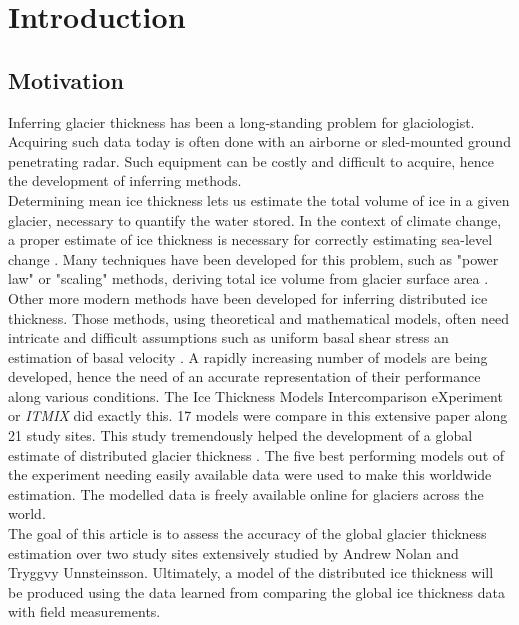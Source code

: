 \documentclass[a4, 12pt]{article}
\begin{document}
\section{Introduction}
\subsection{Motivation}
Inferring glacier thickness has been a long-standing problem for glaciologist. Acquiring such data today is often done with an airborne or sled-mounted ground penetrating radar. Such equipment can be costly and difficult to acquire, hence the development of inferring methods.\\

Determining mean ice thickness lets us estimate the total volume of ice in a given glacier, necessary to quantify the water stored. In the context of climate change, a proper estimate of ice thickness is necessary for correctly estimating sea-level change \cite{farinotti2016accurate}. Many techniques have been developed for this problem, such as "power law" or "scaling" methods, deriving total ice volume from glacier surface area \cite{bahr2015review}. Other more modern methods have been developed for inferring distributed ice thickness. Those methods, using theoretical and mathematical models, often need intricate and difficult assumptions such as uniform basal shear stress an estimation of basal velocity \cite{farinotti2016accurate}. A rapidly increasing number of models are being developed, hence the need of an accurate representation of their performance along various conditions. The Ice Thickness Models Intercomparison eXperiment \cite{farinotti2016accurate} or \textit{ITMIX} did exactly this. 17 models were compare in this extensive paper along 21 study sites. This study tremendously helped the development of a global estimate of distributed glacier thickness \cite{farinotti2019consensus}. The five best performing models out of the experiment needing easily available data were used to make this worldwide estimation. The modelled data is freely available online for glaciers across the world.\\

The goal of this article is to assess the accuracy of the global glacier thickness estimation over two study sites extensively studied by Andrew Nolan and Tryggvy Unnsteinsson. Ultimately, a model of the distributed ice thickness will be produced using the data learned from comparing the global ice thickness data with field measurements.
\end{document}
